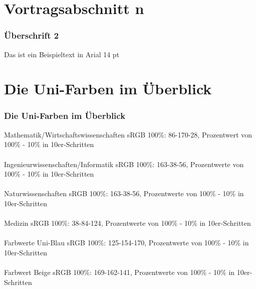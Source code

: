 \documentclass{beamer}
\begin{document}
\section{Vortragsabschnitt n}
\begin{frame}
  \frametitle{\"{U}berschrift 2}
 \vspace{-3.5cm}
 \hspace{-0.8cm}
  Das ist ein Beispieltext in Arial 14 pt
\end{frame}

\section{Die Uni-Farben im \"{U}berblick}
\begin{frame}
 \frametitle{Die Uni-Farben im \"{U}berblick}
 \vspace{-0.1cm}
\hspace{-0.75cm}  \tiny{Mathematik/Wirtschaftswissenschaften sRGB 100\%: 86-170-28, Prozentwert von 100\% - 10\% in 10er-Schritten} \\
\hspace{-0.7cm}  \colorbox{farbwert-mawi}{}{} \\
 \vspace{0.5cm}
\hspace{-0.7cm}  \tiny{Ingenieurwissenschaften/Informatik sRGB 100\%: 163-38-56, Prozentwerte von 100\% - 10\% in 10er-Schritten} \\
\hspace{-0.7cm}  \colorbox{farbwert-inwiin}{}{} \\
  \vspace{0.5cm}
\hspace{-0.7cm}  \tiny{Naturwissenschaften sRGB 100\%: 163-38-56, Prozentwerte von 100\% - 10\% in 10er-Schritten} \\
\hspace{-0.7cm}  \colorbox{farbwert-nawi}{}{} \\
   \vspace{0.5cm}
   \hspace{-0.7cm}  \tiny{Medizin sRGB 100\%: 38-84-124, Prozentwerte von 100\% - 10\% in 	       10er-Schritten} \\
\hspace{-0.7cm}  \colorbox{farbwert-med-blau}{}{}  \\
  \vspace{0.5cm}
\hspace{-0.7cm}  \tiny{Farbwerte Uni-Blau sRGB 100\%: 125-154-170, Prozentwerte von 100\% - 10\% in 	       10er-Schritten} \\
\hspace{-0.7cm}  \colorbox{farbwert-blau}{}{}  \\
  \vspace{0.5cm}
  \hspace{-0.7cm}  \tiny{Farbwert Beige sRGB 100\%: 169-162-141, Prozentwerte von 100\% - 10\% in 10er-Schritten} \\
\hspace{-0.7cm}  \colorbox{farbwert-beige}{}{} \\
  \vspace{0.5cm}
\end{frame}
\end{document}
